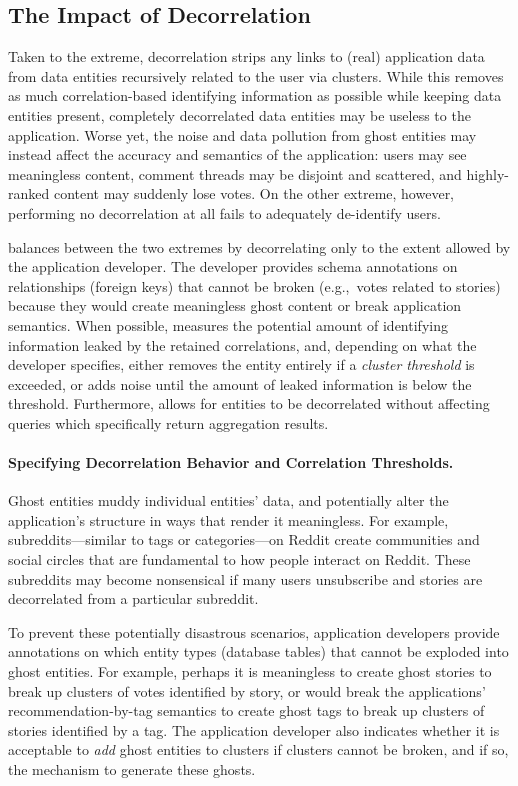 \subsection{The Impact of Decorrelation}
Taken to the extreme, decorrelation strips any links to (real) application data from data entities
recursively related to the user via clusters. While this removes as much correlation-based
identifying information as possible while keeping data entities present, completely decorrelated
data entities may be useless to the application. Worse yet, the noise and data pollution from ghost
entities may instead affect the accuracy and semantics of the application: users may see meaningless
content, comment threads may be disjoint and scattered, and highly-ranked content may suddenly lose
votes. On the other extreme, however, performing no decorrelation at all fails to adequately de-identify
users. 

\sys{} balances between the two extremes by decorrelating only to the extent allowed by the
application developer. The developer provides schema annotations on relationships (foreign keys)
that cannot be broken (e.g.,\ votes related to stories) because they would create meaningless ghost
content or break application semantics. When possible, \sys{} measures the potential amount of identifying
information leaked by the retained correlations, and, depending on what the developer specifies,
either removes the entity entirely if a \emph{cluster threshold} is exceeded, or adds noise
until the amount of leaked information is below the threshold.  Furthermore, \sys{} allows for
entities to be decorrelated without affecting queries which specifically return aggregation results.

\paragraph{Specifying Decorrelation Behavior and Correlation Thresholds.}
Ghost entities muddy individual entities' data, and potentially alter the application's structure in
ways that render it meaningless. For example, subreddits---similar to tags or categories---on Reddit
create communities and social circles that are fundamental to how people interact on Reddit.  These
subreddits may become nonsensical if many users unsubscribe and stories are decorrelated from a
particular subreddit.

To prevent these potentially disastrous scenarios, application developers provide annotations on
which entity types (database tables) that cannot be exploded into ghost entities. For example,
perhaps it is meaningless to create ghost stories to break up clusters of votes identified by story,
or would break the applications' recommendation-by-tag semantics to create ghost tags to break up
clusters of stories identified by a tag.  The application developer also indicates whether it is
acceptable to \emph{add} ghost entities to clusters if clusters cannot be broken, and if so, the
mechanism to generate these ghosts. 

